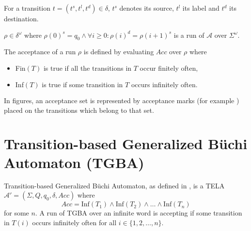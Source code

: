 \documentclass[
  digital, %
  twoside, %
  table,   %
  lof,     %
  lot,     %
]{fithesis3}
\begin{document}
For a transition $t = (t^s, t^l, t^d) \in \delta$, $t^s$ denotes its source, $t^l$ its label and $t^d$ its destination.

$\rho \in \delta^\omega$ where $\rho(0)^s = q_0 \wedge \forall i \geq 0 : \rho(i)^d = \rho(i + 1)^s$ is a run of $\mathcal{A}$ over $\Sigma^\omega$.

The acceptance of a run $\rho$ is defined by evaluating $Acc$ over $\rho$ where
\begin{itemize}
  \item Fin$(T)$ is true if all the transitions in $T$ occur finitely often, 
  \item Inf$(T)$ is true if some transition in $T$ occurs infinitely often.
\end{itemize}

In figures, an acceptance set is represented by acceptance marks (for example \accmarkblue) placed on the transitions which belong to that set.

\section{Transition-based Generalized Büchi Automaton (TGBA)}
\label{sec:tgba}
Transition-based Generalized Büchi Automaton, as defined in \cite{bloemen2017}, is a TELA $\mathcal{A'} = (\Sigma, Q, q_0, \delta, Acc)$ where 
\begin{equation*}
  Acc = \text{Inf}(T_1) \wedge \text{Inf}(T_2) \wedge \dots \wedge \text{Inf}(T_n)
\end{equation*} 
for some $n$. A run of TGBA over an infinite word is accepting if some transition in $T(i)$ occurs infinitely often for all $i \in \{1, 2, \dots, n\}$. 
\end{document}
